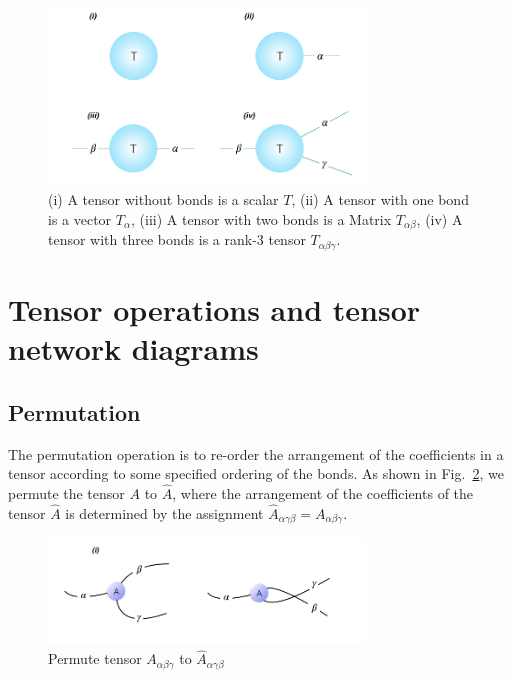 \begin{figure}[ht]
	\centering
	\includegraphics[width=0.75\textwidth]{figures/fig211.png}
	\caption[The reprecentation of commen tensors.]{(i) A tensor without bonds is a scalar $T$, (ii) A tensor with one bond is a vector $T_{\alpha}$, (iii) A tensor with two bonds is a Matrix $T_{\alpha \beta}$, (iv) A tensor with three bonds is a rank-3 tensor $T_{\alpha \beta \gamma}$.}
	\label{fig211}
\end{figure}

\section{Tensor operations and tensor network diagrams} %
\label{operation}

\subsection{Permutation}

The permutation operation is to re-order the arrangement of the coefficients in a tensor according to some specified ordering of the bonds. As shown in Fig.~\ref{fig224}, we permute the tensor $A$ to $\hat{A}$, where the arrangement of the coefficients of the tensor $\hat{A}$ is determined by the assignment $\hat{A}_{\alpha \gamma \beta} = A_{\alpha \beta \gamma}$.

\begin{figure}[H]
	\centering
	\includegraphics[width=0.75\textwidth]{figures/fig224.png}
	\caption[The permutation of a tensor.]{ Permute tensor $A_{\alpha \beta \gamma}$ to $\hat{A}_{\alpha \gamma \beta}$ }
	\label{fig224}
\end{figure}

